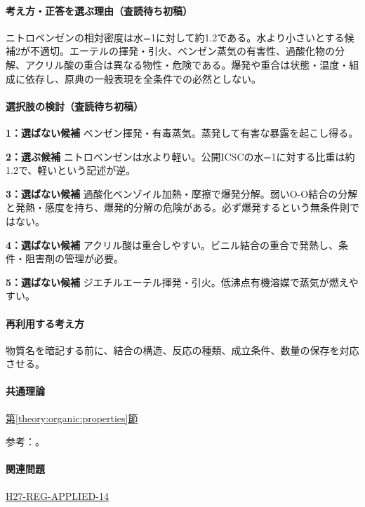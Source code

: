 \paragraph{考え方・正答を選ぶ理由（査読待ち初稿）} ニトロベンゼンの相対密度は水=1に対して約1.2である。水より小さいとする候補2が不適切。エーテルの揮発・引火、ベンゼン蒸気の有害性、過酸化物の分解、アクリル酸の重合は異なる物性・危険である。爆発や重合は状態・温度・組成に依存し、原典の一般表現を全条件での必然としない。

\paragraph{選択肢の検討（査読待ち初稿）}\mbox{}\par

\noindent\textbf{1：選ばない候補} ベンゼン揮発・有毒蒸気。蒸発して有害な暴露を起こし得る。\par

\noindent\textbf{2：選ぶ候補} ニトロベンゼンは水より軽い。公開ICSCの水=1に対する比重は約1.2で、軽いという記述が逆。\par

\noindent\textbf{3：選ばない候補} 過酸化ベンゾイル加熱・摩擦で爆発分解。弱いO-O結合の分解と発熱・感度を持ち、爆発的分解の危険がある。必ず爆発するという無条件則ではない。\par

\noindent\textbf{4：選ばない候補} アクリル酸は重合しやすい。ビニル結合の重合で発熱し、条件・阻害剤の管理が必要。\par

\noindent\textbf{5：選ばない候補} ジエチルエーテル揮発・引火。低沸点有機溶媒で蒸気が燃えやすい。\par

\paragraph{再利用する考え方} 物質名を暗記する前に、結合の構造、反応の種類、成立条件、数量の保存を対応させる。

\paragraph{共通理論} \hyperref[theory:organic:properties]{第\ref*{theory:organic:properties}節}

\par 参考：\cite{organic_nitro,organic_peroxide}。

\paragraph{関連問題} \hyperref[q:h27-reg-applied-14]{H27-REG-APPLIED-14}

